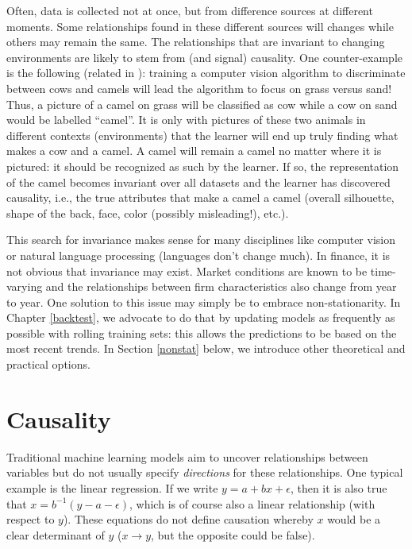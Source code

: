 \documentclass[]{krantz}
\theoremstyle{definition}
\theoremstyle{definition}
\theoremstyle{definition}
\theoremstyle{remark}
\begin{document}
Often, data is collected not at once, but from difference sources at
different moments. Some relationships found in these different sources
will changes while others may remain the same. The relationships that
are invariant to changing environments are likely to stem from (and
signal) causality. One counter-example is the following (related in
\citet{beery2018recognition}): training a computer vision algorithm to
discriminate between cows and camels will lead the algorithm to focus on
grass versus sand! Thus, a picture of a camel on grass will be
classified as cow while a cow on sand would be labelled ``camel''. It is
only with pictures of these two animals in different contexts
(environments) that the learner will end up truly finding what makes a
cow and a camel. A camel will remain a camel no matter where it is
pictured: it should be recognized as such by the learner. If so, the
representation of the camel becomes invariant over all datasets and the
learner has discovered causality, i.e., the true attributes that make a
camel a camel (overall silhouette, shape of the back, face, color
(possibly misleading!), etc.).

This search for invariance makes sense for many disciplines like
computer vision or natural language processing (languages don't change
much). In finance, it is not obvious that invariance may exist. Market
conditions are known to be time-varying and the relationships between
firm characteristics also change from year to year. One solution to this
issue may simply be to embrace non-stationarity. In Chapter
\ref{backtest}, we advocate to do that by updating models as frequently
as possible with rolling training sets: this allows the predictions to
be based on the most recent trends. In Section \ref{nonstat} below, we
introduce other theoretical and practical options.

\hypertarget{causality-1}{%
\section{Causality}\label{causality-1}}

Traditional machine learning models aim to uncover relationships between
variables but do not usually specify \emph{directions} for these
relationships. One typical example is the linear regression. If we write
\(y=a+bx+\epsilon\), then it is also true that
\(x=b^{-1}(y-a-\epsilon)\), which is of course also a linear
relationship (with respect to \(y\)). These equations do not define
causation whereby \(x\) would be a clear determinant of \(y\)
(\(x \rightarrow y\), but the opposite could be false).
\end{document}
